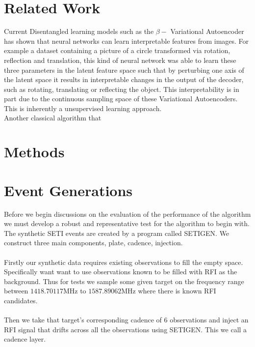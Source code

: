\documentclass{article}
\begin{document}
\section{Related Work}
Current Disentangled learning models such as the $\beta -$ Variational Autoencoder has shown that neural networks can learn interpretable features from images. For example a dataset containing a picture of a circle transformed  via rotation, reflection and translation, this kind of neural network was able to learn these three parameters in the latent feature space such that by perturbing one axis of the latent space it results in interpretable changes in the output of the decoder, such as rotating, translating or reflecting the object. This interpretability is in part due to the continuous sampling space of these Variational Autoencoders. This is inherently a unsupervised learning approach. \\ 

Another classical algorithm that 

\section{Methods}

\section{Event Generations}
Before we begin discussions on the evaluation of the performance of the algorithm we must develop a robust and representative test for the algorithm to begin with. The synthetic SETI events are created by a program called SETIGEN. We construct three main components, plate, cadence, injection. \\ \\

Firstly our synthetic data requires existing observations to fill the empty space. Specifically want want to use observations known to be filled with RFI as the background. Thus for tests we sample some given target on the frequency range between $1418.70117$MHz to $1587.89062$MHz where there is known RFI candidates. \\\\

Then we take that target's corresponding cadence of 6 observations and inject an RFI signal that drifts across all the observations using SETIGEN. This we call a 
cadence layer. \\\\
\end{document}

